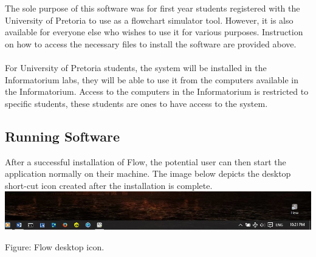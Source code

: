 \documentclass[11pt,a4paper,titlepage]{article}
\begin{document}
	The sole purpose of this software was for first year students registered with the University of Pretoria to use as a flowchart simulator tool. However, it is also available for everyone else who wishes to use it for various purposes. Instruction on how to access the necessary files to install the software are provided above.\\
	\\For University of Pretoria students, the system will be installed in the Informatorium labs, they will be able to use it from the computers available in the Informatorium. Access to the computers in the Informatorium is restricted to specific students, these students are ones to have access to the system.\\



	
	\subsection{Running Software}
	
	
		
	
	
		After a successful installation of Flow, the potential user can then start the application normally on their machine. The image below depicts the desktop short-cut icon created after the installation is complete.	\\
		
		\includegraphics[width=14cm]{images/DesktopIcon.jpg}
		\begin{center}
			Figure: Flow desktop icon.\\
		\end{center} 
		
\end{document}

